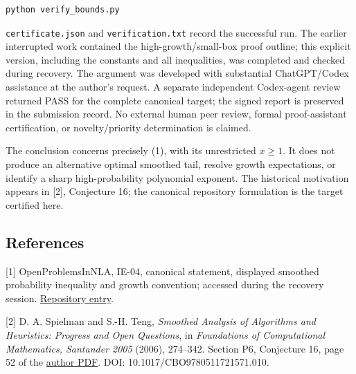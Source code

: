 \documentclass[10pt,a4paper]{article}
\begin{document}
\begin{verbatim}
python verify_bounds.py
\end{verbatim}

\texttt{certificate.json} and \texttt{verification.txt} record the
successful run. The earlier interrupted work contained the
high-growth/small-box proof outline; this explicit version, including
the constants and all inequalities, was completed and checked during
recovery. The argument was developed with substantial ChatGPT/Codex
assistance at the author's request. A separate independent Codex-agent
review returned PASS for the complete canonical target; the signed
report is preserved in the submission record. No external human peer
review, formal proof-assistant certification, or novelty/priority
determination is claimed.

The conclusion concerns precisely (1), with its unrestricted \(x\geq1\).
It does not produce an alternative optimal smoothed tail, resolve growth
expectations, or identify a sharp high-probability polynomial exponent.
The historical motivation appears in {[}2{]}, Conjecture 16; the
canonical repository formulation is the target certified here.


\subsection{References}\label{references}

{[}1{]} OpenProblemsInNLA, IE-04, canonical statement, displayed
smoothed probability inequality and growth convention; accessed during
the recovery session.
\href{https://github.com/ajt60gaibb/OpenProblemsInNLA/tree/main/linear-systems-and-elimination/IE-04}{Repository
entry}.

{[}2{]} D. A. Spielman and S.-H. Teng, \emph{Smoothed Analysis of
Algorithms and Heuristics: Progress and Open Questions}, in
\emph{Foundations of Computational Mathematics, Santander 2005} (2006),
274--342. Section P6, Conjecture 16, page 52 of the
\href{https://www.cs.yale.edu/homes/spielman/PAPERS/focmSmoothed.pdf}{author
PDF}. DOI: 10.1017/CBO9780511721571.010.
\end{document}
